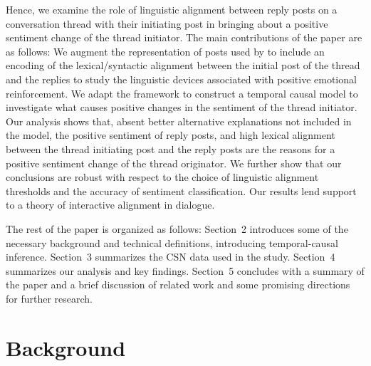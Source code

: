 Hence, we examine the role of linguistic alignment between reply posts on a conversation thread with their initiating post in bringing about a positive sentiment change of the thread initiator. The main contributions of the paper are as follows: We augment the representation of posts used by \textcite{bui2016temporal} to include an encoding of the lexical/syntactic alignment between the initial post of the thread and the replies to study the linguistic devices associated with positive emotional reinforcement. We adapt the framework to construct a temporal causal model to investigate what causes positive changes in the sentiment of the thread initiator. Our analysis shows that, absent better alternative explanations not included in the model, the positive sentiment  of  reply posts,  and  high lexical alignment between the thread initiating post and the reply posts are the reasons for a positive sentiment change of the thread originator. We further show that our conclusions are robust with respect to the choice of linguistic alignment thresholds and the accuracy of sentiment classification. Our results lend support to a theory of interactive alignment in dialogue.

The rest of the paper is organized as follows: Section~2 introduces some of the necessary background and technical definitions, introducing temporal-causal inference. Section~3 summarizes the CSN data used in the study. Section~4 summarizes our analysis and key findings.  Section~5 concludes with a summary of the paper and a brief discussion of related work and some promising directions for further research.





\section{Background}

